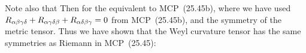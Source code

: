 \documentclass[11pt]{article}
\begin{document}
{	Note also that
	Then for the equivalent to MCP~(25.45b),
	where we have used $R_{\alpha \beta \gamma \delta} + R_{\alpha \gamma \delta \beta} + R_{\alpha \delta \beta \gamma} = 0$ from MCP~(25.45b), and the symmetry of the metric tensor.  Thus we have shown that the Weyl curvature tensor has the same symmetries as Riemann in MCP~(25.45): \vfix
}
\end{document}
